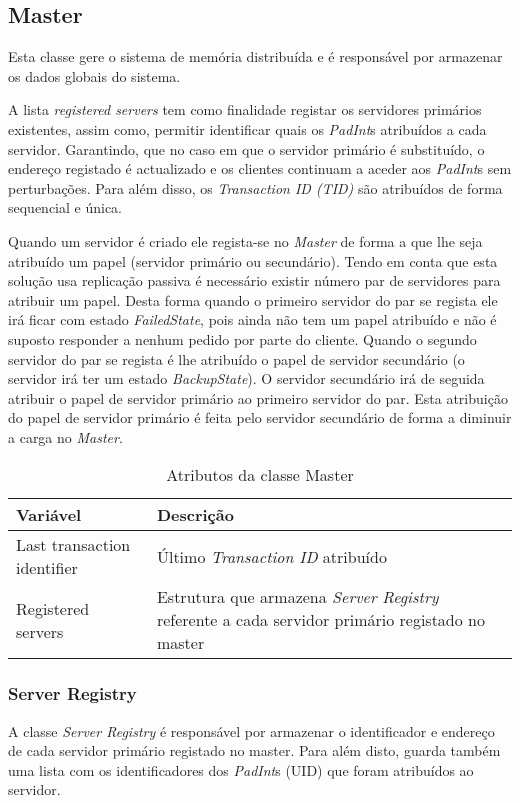 \subsection{Master}

Esta classe gere o sistema de memória distribuída e é responsável por armazenar os dados globais do sistema.

A lista \textit{registered servers} tem como finalidade registar os servidores primários existentes, assim como, permitir identificar quais os \textit{PadInt}s atribuídos a cada servidor. Garantindo, que no caso em que o servidor primário é substituído, o endereço registado é actualizado e os clientes continuam a aceder aos \textit{PadInt}s sem perturbações. Para além disso, os \textit{Transaction ID (TID)} são atribuídos de forma sequencial e única.

Quando um servidor é criado ele regista-se no \textit{Master} de forma a que lhe seja atribuído um papel (servidor primário ou secundário). Tendo em conta que esta solução usa replicação passiva é necessário existir número par de servidores para atribuir um papel. Desta forma quando o primeiro servidor do par se regista ele irá ficar com estado \textit{FailedState}, pois ainda não tem um papel atribuído e não é suposto responder a nenhum pedido por parte do cliente. Quando o segundo servidor do par se regista é lhe atribuído o papel de servidor secundário (o servidor irá ter um estado \textit{BackupState}). O servidor secundário irá de seguida atribuir o papel de servidor primário ao primeiro servidor do par. Esta atribuição do papel de servidor primário é feita pelo servidor secundário de forma a diminuir a carga no \textit{Master}.

\begin{table}[H]
\centering
\begin{tabular}{| p{2cm} | p{5cm} |}
\hline
\textbf{Variável} & \textbf{Descrição} \\
\hline
Last transaction
identifier & Último \textit{Transaction ID} atribuído \\
\hline
Registered
servers & Estrutura que armazena \textit{ Server Registry} referente a cada servidor primário registado no master \\
\hline
\end{tabular}
\caption{Atributos da classe Master}
\end{table}


\subsubsection{Server Registry}
A classe \textit{Server Registry} é responsável por armazenar o identificador e endereço de cada servidor primário registado no master. Para além disto, guarda também uma lista com os identificadores dos \textit{PadInt}s  (UID) que foram atribuídos ao servidor.

